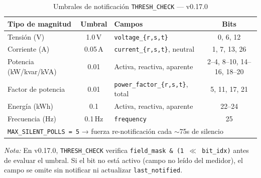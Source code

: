 
\begin{table}[htbp]
\centering
\caption{Umbrales de notificación \texttt{THRESH\_CHECK} — v0.17.0}
\label{tab:thresholds-v017}
\begin{tabular}{l c l c}
\toprule
\textbf{Tipo de magnitud} & \textbf{Umbral} & \textbf{Campos} & \textbf{Bits} \\
\midrule
Tensión (V)        & 1.0\,V    & \texttt{voltage\_\{r,s,t\}}         & 0, 6, 12 \\
Corriente (A)      & 0.05\,A   & \texttt{current\_\{r,s,t\}}, neutral & 1, 7, 13, 26 \\
Potencia (kW/kvar/kVA) & 0.01 & Activa, reactiva, aparente          & 2--4, 8--10, 14--16, 18--20 \\
Factor de potencia & 0.01      & \texttt{power\_factor\_\{r,s,t\}}, total & 5, 11, 17, 21 \\
Energía (kWh)      & 0.1       & Activa, reactiva, aparente          & 22--24 \\
Frecuencia (Hz)    & 0.1\,Hz   & \texttt{frequency}                  & 25 \\
\midrule
\multicolumn{4}{l}{\texttt{MAX\_SILENT\_POLLS = 5} → fuerza re-notificación cada $\sim$75s de silencio} \\
\bottomrule
\end{tabular}

\smallskip
\footnotesize
\textit{Nota:} En v0.17.0, \texttt{THRESH\_CHECK} verifica \texttt{field\_mask \& (1 $\ll$ bit\_idx)}
antes de evaluar el umbral. Si el bit no está activo (campo no leído del medidor),
el campo se omite sin notificar ni actualizar \texttt{last\_notified}.
\end{table}
